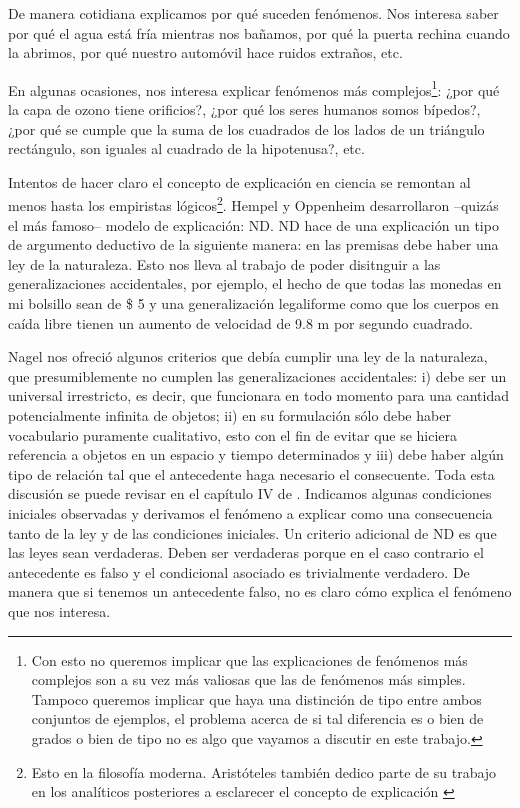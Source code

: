 {\noindent De manera cotidiana explicamos por qué suceden fenómenos. Nos interesa saber por qué el agua está fría mientras nos bañamos, por qué la puerta rechina cuando la abrimos, por qué nuestro automóvil hace ruidos extraños, etc.

En algunas ocasiones, nos interesa explicar fenómenos más complejos\footnote{Con esto no queremos implicar que las explicaciones de fenómenos más complejos son a su vez más valiosas que las de fenómenos más simples. Tampoco queremos implicar que haya una distinción de tipo entre ambos conjuntos de ejemplos, el problema acerca de si tal diferencia es o bien de grados o bien de tipo no es algo que vayamos a discutir en este trabajo.}: ¿por qué la capa de ozono tiene orificios?, ¿por qué los seres humanos somos bípedos?, ¿por qué se cumple que la suma de los cuadrados de los lados de un triángulo rectángulo, son iguales al cuadrado de la hipotenusa?, etc.

Intentos de hacer claro el concepto de explicación en ciencia se remontan al menos hasta los empiristas lógicos\footnote{Esto en la filosofía moderna. Aristóteles también dedico parte de su trabajo en los analíticos posteriores a esclarecer el concepto de explicación \cite{Aristoteles2009}}. Hempel y Oppenheim desarrollaron --quizás el más famoso-- modelo de explicación: ND. ND hace de una explicación un tipo de argumento deductivo de la siguiente manera: en las premisas debe haber una ley de la naturaleza. Esto nos lleva al trabajo de poder disitnguir a las generalizaciones accidentales, por ejemplo, el hecho de que todas las monedas en mi bolsillo sean de \$ 5 y una generalización legaliforme como que los cuerpos en caída libre tienen un aumento de velocidad de 9.8 m por segundo cuadrado.

Nagel nos ofreció algunos criterios que debía cumplir una ley de la naturaleza, que presumiblemente no cumplen las generalizaciones accidentales: i) debe ser un universal irrestricto, es decir, que funcionara en todo momento para una cantidad potencialmente infinita de objetos; ii) en su formulación sólo debe haber vocabulario puramente cualitativo, esto con el fin de evitar que se hiciera referencia a objetos en un espacio y tiempo determinados y iii) debe haber algún tipo de relación tal que el antecedente haga necesario el consecuente. Toda esta discusión se puede revisar en el capítulo IV de \cite{Nagel2006}. Indicamos algunas condiciones iniciales observadas y derivamos el fenómeno a explicar como una consecuencia tanto de la ley y de las condiciones iniciales. Un criterio adicional de ND es que las leyes sean verdaderas. Deben ser verdaderas porque en el caso contrario el antecedente es falso y el condicional asociado es trivialmente verdadero. De manera que si tenemos un antecedente falso, no es claro cómo explica el fenómeno que nos interesa.

}
